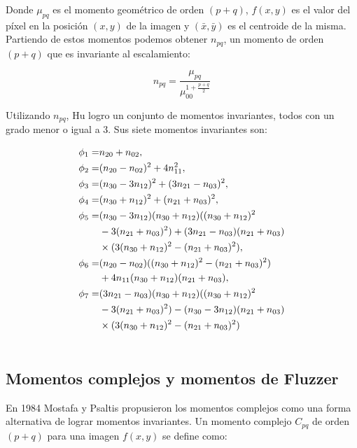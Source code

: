 \documentclass[a4paper, 11pt, oneside]{report}
\begin{document}
Donde $\mu_{pq}$ es el momento geométrico de orden $(p+q)$, $f(x,y)$ es el valor del píxel en la posición $(x,y)$ de la imagen y $(\bar{x},\bar{y})$ es el centroide de la misma. Partiendo de estos momentos podemos obtener $n_{pq}$, un momento de orden $(p+q)$ que es invariante al escalamiento:

	\begin{equation}\label{eq2}
		n_{pq} = \frac{\mu_{pq}}{ \mu_{00}^{1+\frac{p+q}{2}} }
	\end{equation}

Utilizando $n_{pq}$, Hu logro un conjunto de momentos invariantes, todos con un grado menor o igual a 3. Sus siete momentos invariantes son:

	\begin{align}
		\phi_1 =& n_{20} + n_{02}, \notag\\ 
		\phi_2 =& (n_{20} - n_{02})^{2} + 4n_{11}^{2}, \notag \\ 
		\phi_3 =& (n_{30} - 3n_{12})^{2} + (3n_{21} - n_{03})^{2}, \notag \\ 
		\phi_4 =& (n_{30} + n_{12})^{2} + (n_{21} + n_{03})^{2},\notag \\ 
		\phi_5 =& (n_{30} - 3n_{12})(n_{30} + n_{12})((n_{30} + n_{12})^{2} \notag \\
				& - 3(n_{21} + n_{03})^{2}) + (3n_{21} - n_{03})(n_{21} + n_{03})\notag\\ 
				& \times (3(n_{30} + n_{12})^{2} - (n_{21} + n_{03})^{2}),\notag\\ 
		\phi_6 =& (n_{20} - n_{02})((n_{30} + n_{12})^{2} - (n_{21} + n_{03})^{2})\notag\\
				& + 4n_{11}(n_{30} + n_{12})(n_{21} + n_{03}),\notag\\
		\phi_7 =& (3n_{21} - n_{03})(n_{30} + n_{12})((n_{30} + n_{12})^{2}\notag\\
				& - 3(n_{21} + n_{03})^{2}) - (n_{30} - 3n_{12})(n_{21} + n_{03}) \notag\\
				& \times (3(n_{30} + n_{12})^{2} - (n_{21} + n_{03})^{2}) \label{eq:huMom} \\ \notag
	\end{align}

\subsection{Momentos complejos y momentos de Fluzzer}

En 1984 Mostafa y Psaltis \cite{mostaf84} propusieron los momentos complejos como una forma alternativa de lograr momentos invariantes. Un momento complejo $C_{pq}$ de orden $(p+q)$ para una imagen $f(x,y)$ se define como:
\end{document}
